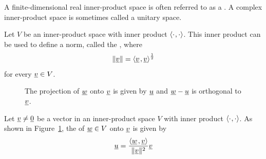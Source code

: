 A finite-dimensional real inner-product space is often referred to as a .
A complex inner-product space is sometimes called a unitary space.

\begin{definition}
Let $V$ be an inner-product space with inner product ${\langle  \cdot  \mskip1mu ,  \cdot  \rangle}$.
This inner product can be used to define a norm, called the , where
\begin{equation*}
\left\| \underline{v} \right\| = {\left\langle  \underline{v}  \mskip2mu ,  \underline{v}  \right\rangle}^{\frac{1}{2}}
\end{equation*}
for every $\underline{v} \in V$.
\end{definition}

\begin{figure}
\centering
{}
\caption{\label{fig:vector_projection}The projection of $\underline{w}$ onto $\underline{v}$ is given by $\underline{u}$ and $\underline{w}-\underline{u}$ is orthogonal to $\underline{v}$.}
\end{figure}

\begin{definition}
Let $\underline{v} \neq \underline{0}$ be a vector in an inner-product space $V$ with inner product ${\langle  \cdot  \mskip1mu ,  \cdot  \rangle}$.
As shown in Figure~\ref{fig:vector_projection}, the  of $\underline{w}\in V$ onto $\underline{v}$ is given by
\begin{equation*}
\underline{u} = \frac{{\left\langle  \underline{w}  \mskip2mu ,  \underline{v}  \right\rangle}}{\|\underline{v}\|^2} \underline{v}
\end{equation*}
\end{definition}

